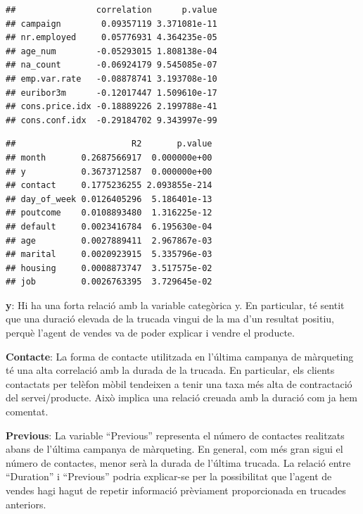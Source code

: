 \documentclass[
]{article}
\newenvironment{Shaded}{\begin{snugshade}}{\end{snugshade}}
\newcommand{\CommentTok}[1]{\textcolor[rgb]{0.56,0.35,0.01}{\textit{#1}}}
\newcommand{\NormalTok}[1]{#1}
\newcommand{\SpecialCharTok}[1]{\textcolor[rgb]{0.00,0.00,0.00}{#1}}
\begin{document}
\begin{Shaded}
\end{Shaded}

\begin{verbatim}
##                correlation      p.value
## campaign        0.09357119 3.371081e-11
## nr.employed     0.05776931 4.364235e-05
## age_num        -0.05293015 1.808138e-04
## na_count       -0.06924179 9.545085e-07
## emp.var.rate   -0.08878741 3.193708e-10
## euribor3m      -0.12017447 1.509610e-17
## cons.price.idx -0.18889226 2.199788e-41
## cons.conf.idx  -0.29184702 9.343997e-99
\end{verbatim}

\begin{Shaded}
\end{Shaded}

\begin{verbatim}
##                       R2       p.value
## month       0.2687566917  0.000000e+00
## y           0.3673712587  0.000000e+00
## contact     0.1775236255 2.093855e-214
## day_of_week 0.0126405296  5.186401e-13
## poutcome    0.0108893480  1.316225e-12
## default     0.0023416784  6.195630e-04
## age         0.0027889411  2.967867e-03
## marital     0.0020923915  5.335796e-03
## housing     0.0008873747  3.517575e-02
## job         0.0026763395  3.729645e-02
\end{verbatim}

\textbf{y}: Hi ha una forta relació amb la variable categòrica y. En
particular, té sentit que una duració elevada de la trucada vingui de la
ma d'un resultat positiu, perquè l'agent de vendes va de poder explicar
i vendre el producte.

\textbf{Contacte}: La forma de contacte utilitzada en l'última campanya
de màrqueting té una alta correlació amb la durada de la trucada. En
particular, els clients contactats per telèfon mòbil tendeixen a tenir
una taxa més alta de contractació del servei/producte. Això implica una
relació creuada amb la duració com ja hem comentat.

\textbf{Previous}: La variable ``Previous'' representa el número de
contactes realitzats abans de l'última campanya de màrqueting. En
general, com més gran sigui el número de contactes, menor serà la durada
de l'última trucada. La relació entre ``Duration'' i ``Previous'' podria
explicar-se per la possibilitat que l'agent de vendes hagi hagut de
repetir informació prèviament proporcionada en trucades anteriors.
\end{document}
